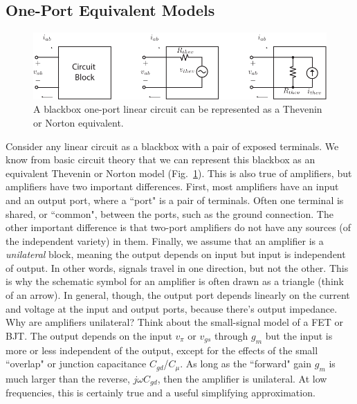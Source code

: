 \subsection{One-Port Equivalent Models}
\begin{figure}[tb]
\centering
\includegraphics[scale=1]{oneports}
\caption{A blackbox one-port linear circuit can be represented as a Thevenin or Norton equivalent.} \label{fig:oneports}
\end{figure}
Consider any linear circuit as a blackbox with a pair of exposed terminals.  We know from basic circuit theory that we can represent this blackbox as an equivalent Thevenin or Norton model (Fig.~\ref{fig:oneports}).  This is also true of amplifiers, but amplifiers have two important differences.  First, most amplifiers have an input and an output port, where a ``port" is a  pair of terminals.  Often one terminal is shared, or ``common", between the ports, such as the ground connection.   The other important difference is that two-port amplifiers do not have any sources (of the independent variety) in them.  Finally, we assume that an amplifier is a \textit{unilateral} block, meaning the output depends on input but input is independent of output.  In other words, signals travel in one direction, but not the other.  This is why the schematic symbol for an amplifier is often drawn as a triangle (think of an arrow).  In general, though, the output port depends linearly on the current and voltage at the input and output ports, because there's output impedance.  
Why are amplifiers unilateral?  Think about the small-signal model of a FET or BJT.  The output depends on the input $v_{\pi}$ or $v_{gs}$ through $g_m$ but the input is more or less independent of the output, except for the effects of the small ``overlap" or junction capacitance $C_{gd}$/$C_\mu$.  As long as the ``forward" gain $g_m$ is much larger than the reverse, $j\omega C_{gd}$, then the amplifier is unilateral.  At low frequencies, this is certainly true and a useful simplifying approximation.
